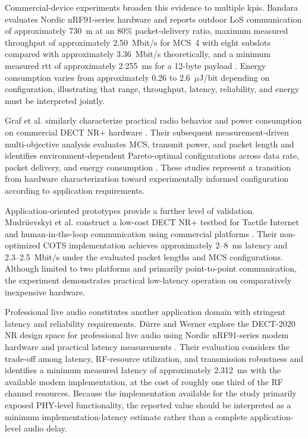 Commercial-device experiments broaden this evidence to multiple \glspl{kpi}.
Bandara evaluates Nordic nRF91-series hardware and reports outdoor LoS
communication of approximately 730~m at an 80\% packet-delivery ratio,
maximum measured throughput of approximately 2.50~Mbit/s for MCS~4 with
eight subslots compared with approximately 3.36~Mbit/s theoretically, and a
minimum measured \gls{rtt} of approximately 2.255~ms for a 12-byte payload
\cite{bandaraExperimentalValidationAnalysis2025}. Energy consumption varies
from approximately 0.26 to 2.6~$\mu$J/bit depending on configuration,
illustrating that range, throughput, latency, reliability, and energy must be
interpreted jointly.

Graf et al. similarly characterize practical radio behavior and power
consumption on commercial DECT NR+ hardware
\cite{grafWhatExpectWhen2026}. Their subsequent measurement-driven
multi-objective analysis evaluates MCS, transmit power, and packet length and
identifies environment-dependent Pareto-optimal configurations across data
rate, packet delivery, and energy consumption
\cite{grafParetoOptimalityApproach2026a}. These studies represent a transition
from hardware characterization toward experimentally informed configuration
according to application requirements.

Application-oriented prototypes provide a further level of validation.
Mudriievskyi et al. construct a low-cost DECT NR+ testbed for Tactile Internet
and human-in-the-loop communication using commercial platforms
\cite{mudriievskyiCHEAP5GDECT2024a}. Their non-optimized COTS implementation
achieves approximately 2--8~ms latency and 2.3--2.5~Mbit/s under the evaluated
packet lengths and MCS configurations. Although limited to two platforms and
primarily point-to-point communication, the experiment demonstrates practical
low-latency operation on comparatively inexpensive hardware.

Professional live audio constitutes another application domain with stringent
latency and reliability requirements. D{\"u}rre and Werner explore the
DECT-2020 NR design space for professional live audio using Nordic nRF91-series
modem hardware and practical latency measurements
\cite{durreDECT2020NRProfessional2024}. Their evaluation considers the
trade-off among latency, RF-resource utilization, and transmission robustness
and identifies a minimum measured latency of approximately 2.312~ms with the
available modem implementation, at the cost of roughly one third of the RF
channel resources. Because the implementation available for the study
primarily exposed PHY-level functionality, the reported value should be
interpreted as a minimum implementation-latency estimate rather than a
complete application-level audio delay.

